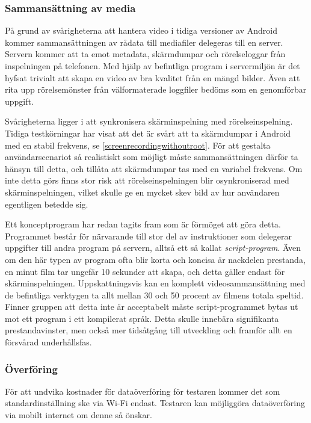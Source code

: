 \subsubsection{Sammansättning av media}
På grund av svårigheterna att hantera video i tidiga versioner av Android kommer sammansättningen av rådata till mediafiler delegeras till en server. Servern kommer att ta emot metadata, skärmdumpar och rörelseloggar från inspelningen på telefonen. Med hjälp av befintliga program i servermiljön är det hyfsat trivialt att skapa en video av bra kvalitet från en mängd bilder. Även att rita upp rörelsemönster från välformaterade loggfiler bedöms som en genomförbar uppgift.

Svårigheterna ligger i att synkronisera skärminspelning med rörelseinspelning. Tidiga testkörningar har visat att det är svårt att ta skärmdumpar i Android med en stabil frekvens, se \ref{screenrecordingwithoutroot}. För att gestalta användarscenariot så realistiskt som möjligt måste sammansättningen därför ta hänsyn till detta, och tillåta att skärmdumpar tas med en variabel frekvens. Om inte detta görs finns stor risk att rörelseinspelningen blir osynkroniserad med skärminspelningen, vilket skulle ge en mycket skev bild av hur användaren egentligen betedde sig.

Ett konceptprogram har redan tagits fram som är förmöget att göra detta. Programmet består för närvarande till stor del av instruktioner som delegerar uppgifter till andra program på servern, alltså ett så kallat \textit{script-program}. Även om den här typen av program ofta blir korta och koncisa är nackdelen prestanda, en minut film tar ungefär 10 sekunder att skapa, och detta gäller endast för skärminspelningen. Uppskattningsvis kan en komplett videosammansättning med de befintliga verktygen ta allt mellan 30 och 50 procent av filmens totala speltid. Finner gruppen att detta inte är acceptabelt måste script-programmet bytas ut mot ett program i ett kompilerat språk. Detta skulle innebära signifikanta prestandavinster, men också mer tidsåtgång till utveckling och framför allt en försvårad underhållsfas.

\subsubsection{Överföring}
För att undvika kostnader för dataöverföring för testaren kommer det som standardinställning ske via Wi-Fi endast. Testaren kan möjliggöra dataöverföring via mobilt internet om denne så önskar.

